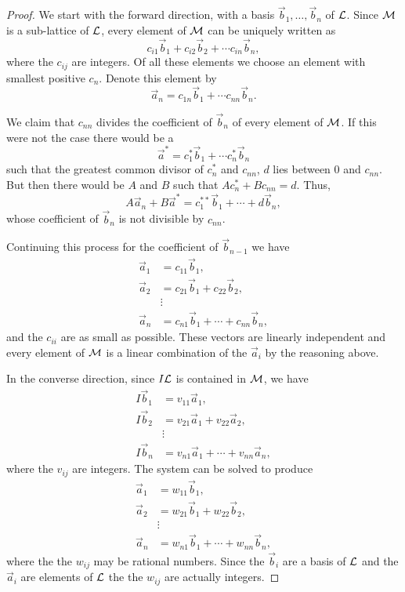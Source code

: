 \begin{proof}
We start with the forward direction, with a basis $\vec{b}_1, \ldots,
\vec{b}_n$ of ${\cal L}$.  Since ${\cal M}$ is a sub-lattice of ${\cal
L}$, every element of ${\cal M}$ can be uniquely written as
\[
c_{i1} \vec{b}_1 + c_{i2} \vec{b}_2 + \cdots c_{in} \vec{b}_n,
\]
where the $c_{ij}$ are integers.  Of all these elements we choose an
element with smallest positive $c_n$.  Denote this element by 
\[
\vec{a}_n = c_{1n} \vec{b}_1 + \cdots c_{nn} \vec{b}_n.
\]

We claim that $c_{nn}$ divides the
coefficient of $\vec{b}_n$ of every element of ${\cal M}$.  If this
were not the case there would be a
\[
\vec{a}^{\ast} = c_1^{\ast} \vec{b}_1 + \cdots c_n^{\ast} \vec{b}_n
\]
such that the greatest common divisor of $c_n^{\ast}$ and $c_{nn}$,
$d$ lies between $0$ and $c_{nn}$.  But then there would be $A$ and
$B$ such that $A c^{\ast}_n + B c_{nn} = d$.  Thus,
\[
A \vec{a}_n + B \vec{a}^{\ast} = c^{\ast\ast}_1 \vec{b}_1 + \cdots + d
\vec{b}_n,
\]
whose coefficient of $\vec{b}_n$ is not divisible by $c_{nn}$.  

Continuing this process for the coefficient of $\vec{b}_{n-1}$ we have
\[
\begin{aligned}
\vec{a}_1 & = c_{11} \vec{b}_1,  \\
\vec{a}_2 & = c_{21} \vec{b}_1 + c_{22} \vec{b}_2,  \\
   & \vdots \\
\vec{a}_n & = c_{n1} \vec{b}_1 + \cdots + c_{nn} \vec{b}_n,  
\end{aligned}
\]
and the $c_{ii}$ are as small as possible.  These vectors are 
linearly independent and every element of ${\cal M}$ is a linear
combination of the $\vec{a}_i$ by the reasoning above. 

In the converse direction, since $I {\cal L}$ is contained in ${\cal
M}$, we have
\[
\begin{aligned}
I \vec{b}_1 & = v_{11} \vec{a}_1,  \\
I \vec{b}_2 & = v_{21} \vec{a}_1 + v_{22} \vec{a}_2,  \\
   & \vdots \\
I \vec{b}_n & = v_{n1} \vec{a}_1 + \cdots + v_{nn} \vec{a}_n,  
\end{aligned}
\]
where the $v_{ij}$ are integers.  The system can be solved to produce
\[
\begin{aligned}
\vec{a}_1 & = w_{11} \vec{b}_1,  \\
\vec{a}_2 & = w_{21} \vec{b}_1 + w_{22} \vec{b}_2,  \\
   & \vdots \\
\vec{a}_n & = w_{n1} \vec{b}_1 + \cdots + w_{nn} \vec{b}_n,  
\end{aligned}
\]
where the the $w_{ij}$ may be rational numbers.  Since the $\vec{b}_i$
are a basis of ${\cal L}$ and the $\vec{a}_i$ are elements of ${\cal
L}$ the the $w_{ij}$ are actually integers.
\end{proof}

